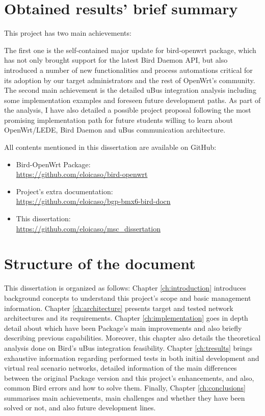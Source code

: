 \section{Obtained results' brief summary}
This project has two main achievements:

The first one is the self-contained major update for bird-openwrt package, which has not only brought support for the latest Bird Daemon API, but also introduced a number of new functionalities and process automations critical for its adoption by our target administrators and the rest of OpenWrt's community.
The second main achievement is the detailed uBus integration analysis including some implementation examples and foreseen future development paths. As part of the analysis, I have also detailed a possible project proposal following the most promising implementation path for future students willing to learn about OpenWrt/LEDE, Bird Daemon and uBus communication architecture.

All contents mentioned in this dissertation are available on GitHub:

\begin{itemize}
    \item Bird-OpenWrt Package: \\
    \href{https://github.com/eloicaso/bird-openwrt}{https://github.com/eloicaso/bird-openwrt}
    \item Project's extra documentation:\\
    \href{https://github.com/eloicaso/bgp-bmx6-bird-docn}{https://github.com/eloicaso/bgp-bmx6-bird-docn}
    \item This dissertation:\\
    \href{https://github.com/eloicaso/msc_dissertation}{https://github.com/eloicaso/msc\_dissertation}
\end{itemize}

\section{Structure of the document}
\label{sec:sod}
This dissertation is organized as follows: Chapter \ref{ch:introduction} introduces background concepts to understand this project's scope and basic management information. Chapter \ref{ch:architecture} presents target and tested network architectures and its requirements. Chapter \ref{ch:implementation} goes in depth detail about which have been Package's main improvements and also briefly describing previous capabilities. Moreover, this chapter also details the theoretical analysis done on Bird's uBus integration feasibility. Chapter \ref{ch:tresults} brings exhaustive information regarding performed tests in both initial development and virtual real scenario networks, detailed information of the main differences between the original Package version and this project's enhancements, and also, common Bird errors and how to solve them. Finally, Chapter \ref{ch:conclusions} summarises main achievements, main challenges and whether they have been solved or not, and also future development lines. 

